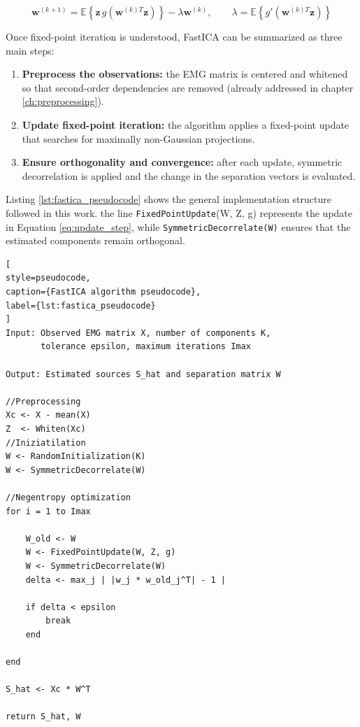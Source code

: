 \begin{equation}
    \mathbf{w}^{(k+1)}
=
\mathbb{E}\left\{
\mathbf{z}\, g\left(\mathbf{w}^{(k)T}\mathbf{z}\right)
\right\}
-
\lambda \mathbf{w}^{(k)}, \qquad 
\lambda =
\mathbb{E}\left\{
g'\left(\mathbf{w}^{(k)T}\mathbf{z}\right)
\right\} 
\label{eq:update_step}
\end{equation}
 

\noindent Once fixed-point iteration is understood, FastICA can be summarized as three main steps:

\begin{enumerate}
    \item \textbf{Preprocess the observations:} the EMG matrix is centered and whitened so that second-order dependencies are removed (already addressed in chapter \ref{ch:preprocessing}).
    
    \item \textbf{Update fixed-point iteration:} the algorithm applies a fixed-point update that searches for maximally non-Gaussian projections.
    
    \item \textbf{Ensure orthogonality and convergence:} after each update, symmetric decorrelation is applied and the change in the separation vectors is evaluated.
\end{enumerate}

Listing \ref{lst:fastica_pseudocode} shows the general implementation structure followed in this work. the line \texttt{FixedPointUpdate}(W, Z, g) represents the update in Equation \ref{eq:update_step}, while \texttt{SymmetricDecorrelate(W)} ensures that the estimated components remain orthogonal.

\begin{lstlisting}[
style=pseudocode,
caption={FastICA algorithm pseudocode},
label={lst:fastica_pseudocode}
]
Input: Observed EMG matrix X, number of components K,
       tolerance epsilon, maximum iterations Imax

Output: Estimated sources S_hat and separation matrix W

//Preprocessing
Xc <- X - mean(X)
Z  <- Whiten(Xc)
//Iniziatilation
W <- RandomInitialization(K)
W <- SymmetricDecorrelate(W)

//Negentropy optimization
for i = 1 to Imax

    W_old <- W
    W <- FixedPointUpdate(W, Z, g)
    W <- SymmetricDecorrelate(W)
    delta <- max_j | |w_j * w_old_j^T| - 1 |

    if delta < epsilon
        break
    end
    
end

S_hat <- Xc * W^T

return S_hat, W
\end{lstlisting}

